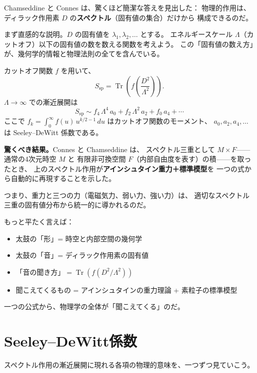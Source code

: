 \documentclass[11pt,a4paper]{article}
\theoremstyle{definition}
\newcommand{\Tr}{\operatorname{Tr}}
\begin{document}
Chamseddine と Connes は、驚くほど簡潔な答えを見出した：
物理的作用は、ディラック作用素 $D$ の\textbf{スペクトル}（固有値の集合）だけから
構成できるのだ。

まず直感的な説明。$D$ の固有値を $\lambda_1, \lambda_2, \ldots$ とする。
エネルギースケール $\Lambda$（カットオフ）以下の固有値の数を数える関数を考えよう。
この「固有値の数え方」が、幾何学的情報と物理法則の全てを含んでいる。

\begin{keybox}
カットオフ関数 $f$ を用いて、
\[
  S_{\mathrm{sp}} = \Tr\!\left(f\!\left(\frac{D^2}{\Lambda^2}\right)\right).
\]
$\Lambda\to\infty$ での漸近展開は
\[
  S_{\mathrm{sp}} \sim f_4\,\Lambda^4\, a_0
                     + f_2\,\Lambda^2\, a_2
                     + f_0\, a_4
                     + \cdots
\]
ここで $f_k = \int_0^\infty f(u)\, u^{k/2-1}\, du$ はカットオフ関数のモーメント、
$a_0, a_2, a_4, \ldots$ は Seeley--DeWitt 係数である。
\end{keybox}

\noindent\textbf{驚くべき結果。}Connes と Chamseddine は、
スペクトル三重として $M\times F$——通常の4次元時空 $M$ と
有限非可換空間 $F$（内部自由度を表す）の積——を取ったとき、
上のスペクトル作用が\textbf{アインシュタイン重力＋標準模型}を
一つの式から自動的に再現することを示した。

つまり、重力と三つの力（電磁気力、弱い力、強い力）は、
適切なスペクトル三重の固有値分布から統一的に導かれるのだ。

\begin{hsbox}
もっと平たく言えば：
\begin{itemize}
  \item 太鼓の「形」= 時空と内部空間の幾何学
  \item 太鼓の「音」= ディラック作用素の固有値
  \item 「音の聞き方」$= \Tr(f(D^2/\Lambda^2))$
  \item 聞こえてくるもの = アインシュタインの重力理論 + 素粒子の標準模型
\end{itemize}
一つの公式から、物理学の全体が「聞こえてくる」のだ。
\end{hsbox}

\section{Seeley--DeWitt係数}
\label{sec:3.3}

スペクトル作用の漸近展開に現れる各項の物理的意味を、一つずつ見ていこう。
\end{document}
